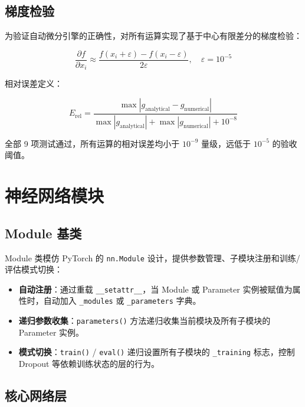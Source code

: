 \documentclass[12pt,a4paper]{ctexart}
\begin{document}
\subsection{梯度检验}

为验证自动微分引擎的正确性，对所有运算实现了基于中心有限差分的梯度检验：

\begin{equation}
\frac{\partial f}{\partial x_i} \approx \frac{f(x_i + \varepsilon) - f(x_i - \varepsilon)}{2\varepsilon}, \quad \varepsilon = 10^{-5}
\end{equation}

相对误差定义：

\begin{equation}
E_{\text{rel}} = \frac{\max|g_{\text{analytical}} - g_{\text{numerical}}|}{\max|g_{\text{analytical}}| + \max|g_{\text{numerical}}| + 10^{-8}}
\end{equation}

全部 9 项测试通过，所有运算的相对误差均小于 $10^{-9}$ 量级，远低于 $10^{-5}$ 的验收阈值。

\section{神经网络模块}

\subsection{Module 基类}

Module 类模仿 PyTorch 的 \texttt{nn.Module} 设计，提供参数管理、子模块注册和训练/评估模式切换：

\begin{itemize}
    \item \textbf{自动注册}：通过重载 \texttt{\_\_setattr\_\_}，当 Module 或 Parameter 实例被赋值为属性时，自动加入 \texttt{\_modules} 或 \texttt{\_parameters} 字典。
    \item \textbf{递归参数收集}：\texttt{parameters()} 方法递归收集当前模块及所有子模块的 Parameter 实例。
    \item \textbf{模式切换}：\texttt{train()} / \texttt{eval()} 递归设置所有子模块的 \texttt{\_training} 标志，控制 Dropout 等依赖训练状态的层的行为。
\end{itemize}

\subsection{核心网络层}
\end{document}
